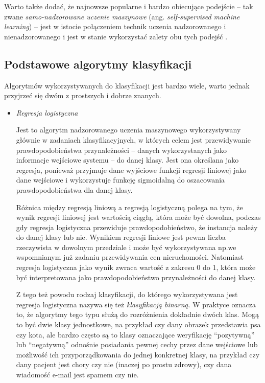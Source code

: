 Warto także dodać, że najnowsze popularne i bardzo obiecujące podejście -- tak zwane \emph{samo-nadzorowane uczenie maszynowe} (ang. \emph{self-supervised machine learning}) -- jest w istocie połączeniem technik uczenia nadzorowanego i nienadzorowanego i jest w stanie wykorzystać zalety obu tych podejść \cite{krishnan2022self}.

\subsection{Podstawowe algorytmy klasyfikacji}

Algorytmów wykorzystywanych do klasyfikacji jest bardzo wiele, warto jednak przyjrzeć się dwóm z prostszych i dobrze znanych.

\begin{itemize}

  \item \emph{Regresja logistyczna}

        Jest to algorytm nadzorowanego uczenia maszynowego wykorzystywany głównie w zadaniach klasyfikacyjnych, w których celem jest przewidywanie prawdopodobieństwa przynależności  -- danych wykorzystanych jako informacje wejściowe systemu -- do danej klasy.
        Jest ona określana jako regresja, ponieważ przyjmuje dane wyjściowe funkcji regresji liniowej jako dane wejściowe i wykorzystuje funkcję sigmoidalną do oszacowania prawdopodobieństwa dla danej klasy.

        Różnica między regresją liniową a regresją logistyczną polega na tym, że wynik regresji liniowej jest wartością ciągłą, która może być dowolna, podczas gdy regresja logistyczna przewiduje prawdopodobieństwo, że instancja należy do danej klasy lub nie.
        Wynikiem regresji liniowe jest pewna liczba rzeczywista w dowolnym przedziale i może być wykorzystywana np.we wspomnianym już zadaniu przewidywania cen nieruchomości.
        Natomiast regresja logistyczna jako wynik zwraca wartość z zakresu 0 do 1, która może być interpretowana jako prawdopodobieństwo przynależności do danej klasy.

        Z tego też powodu rodzaj klasyfikacji, do którego wykorzystywana jest regresja logistyczna nazywa się też \emph{klasyfikacją binarną}.
        W praktyce oznacza to, że algorytmy tego typu służą do rozróżnienia dokładnie dwóch klas.
        Mogą to być dwie klasy jednostkowe, na przykład czy dany obrazek przedstawia psa czy kota, ale bardzo często są to klasy oznaczające weryfikację ``pozytywną'' lub ``negatywną'' odnośnie posiadania pewnej cechy przez dane wejściowe lub możliwość ich przyporządkowania do jednej konkretnej klasy, na przykład czy dany pacjent jest chory czy nie (inaczej po prostu zdrowy), czy dana wiadomość e-mail jest spamem czy nie.


\end{itemize}
